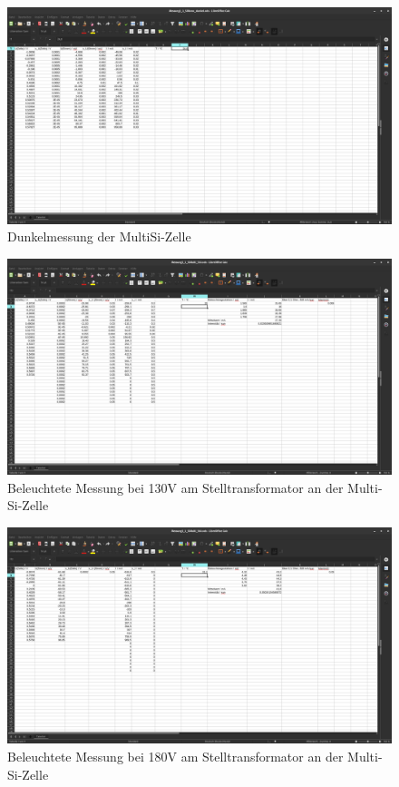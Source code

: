 \begin{figure}[h]
    \captionsetup{justification=centering,margin=2cm}
    \centering
    \includegraphics[angle = 90, width = 12cm]{Bilder/Daten/MessunngMonoSiDunkel.png}
    \caption{Dunkelmessung der MultiSi-Zelle}
\end{figure}

\begin{figure}[h]
    \captionsetup{justification=centering,margin=2cm}
    \centering
    \includegraphics[angle = 90, width = 12cm]{Bilder/Daten/MessunngMulriSi130.png}
    \caption{Beleuchtete Messung bei 130V am Stelltransformator an der Multi-Si-Zelle}
\end{figure}

\begin{figure}[h]
    \captionsetup{justification=centering,margin=2cm}
    \centering
    \includegraphics[angle = 90, width = 12cm]{Bilder/Daten/MessungMultiSi180.png}
    \caption{Beleuchtete Messung bei 180V am Stelltransformator an der Multi-Si-Zelle}
\end{figure}


